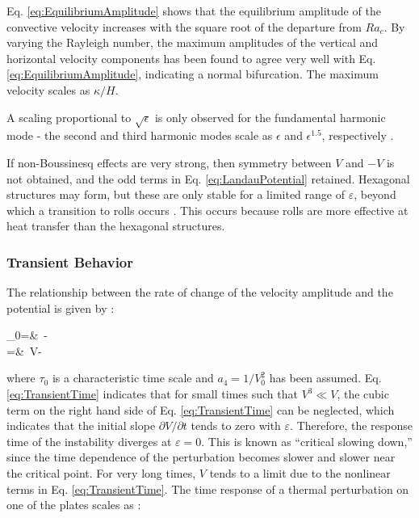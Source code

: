 \documentclass[10pt]{article}
\numberwithin{equation}{section} %
\begin{document}
\beq
\varepsilon\equiv{}
\eeq

Eq. \eqref{eq:EquilibriumAmplitude} shows that the equilibrium amplitude of the convective velocity increases with the square root of the departure from \(Ra_c\). By varying the Rayleigh number, the maximum amplitudes of the vertical and horizontal velocity components has been found to agree very well with Eq. \eqref{eq:EquilibriumAmplitude}, indicating a normal bifurcation. The maximum velocity scales as \(\kappa/H\).


A scaling proportional to \(\sqrt{\epsilon}\) is only observed for the fundamental harmonic mode - the second and third harmonic modes scale as \(\epsilon\) and \(\epsilon^{1.5}\), respectively \cite{berge}.

If non-Boussinesq effects are very strong, then symmetry between \(V\) and \(-V\) is not obtained, and the odd terms in Eq. \eqref{eq:LandauPotential} retained. Hexagonal structures may form, but these are only stable for a limited range of \(\varepsilon\), beyond which a transition to rolls occurs \cite{sandberg}. This occurs because rolls are more effective at heat transfer than the hexagonal structures.

\subsubsection{Transient Behavior}

The relationship between the rate of change of the velocity amplitude and the potential is given by \cite{berge}:

\beqa
\label{eq:TransientTime}
\tau_0=&\ -\\
=&\ \varepsilon V-\\
\eeqa

where \(\tau_0\) is a characteristic time scale and \(a_4=1/V_0^2\) has been assumed. Eq. \eqref{eq:TransientTime} indicates that for small times such that \(V^3\ll V\), the cubic term on the right hand side of Eq. \eqref{eq:TransientTime} can be neglected, which indicates that the initial slope \(\partial V/\partial t\) tends to zero with \(\varepsilon\). Therefore, the response time of the instability diverges at \(\varepsilon=0\). This is known as ``critical slowing down,'' since the time dependence of the perturbation becomes slower and slower near the critical point. For very long times, \(V\) tends to a limit due to the nonlinear terms in Eq. \eqref{eq:TransientTime}. The time response of a thermal perturbation on one of the plates scales as \cite{berge}:
\end{document}
